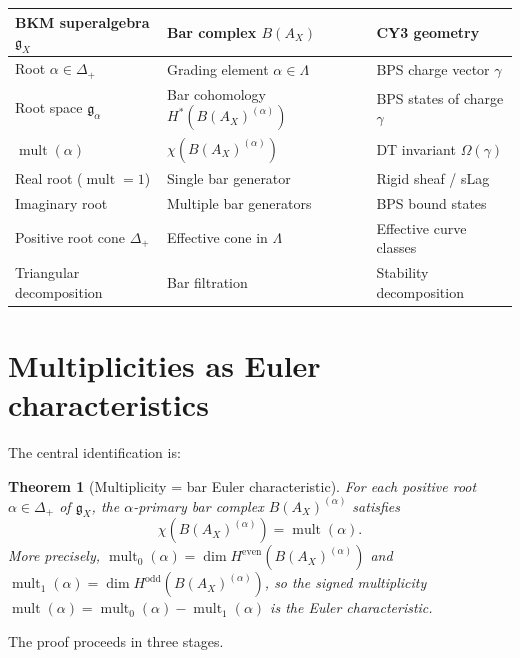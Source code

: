 \documentclass[11pt]{article}
\newtheorem{theorem}{Theorem}[section]
\theoremstyle{definition}
\theoremstyle{remark}
\DeclareMathOperator{\mult}{mult}
\newcommand{\frakg}{\mathfrak{g}}
\begin{document}
\begin{center}
\renewcommand{\arraystretch}{1.4}
\begin{tabular}{lll}
\hline
\textbf{BKM superalgebra $\frakg_X$} & \textbf{Bar complex $B(A_X)$} & \textbf{CY3 geometry} \\
\hline
Root $\alpha \in \Delta_+$ & Grading element $\alpha \in \Lambda$ & BPS charge vector $\gamma$ \\
Root space $\frakg_\alpha$ & Bar cohomology $H^*(B(A_X)^{(\alpha)})$ & BPS states of charge $\gamma$ \\
$\mult(\alpha)$ & $\chi(B(A_X)^{(\alpha)})$ & DT invariant $\Omega(\gamma)$ \\
Real root ($\mult = 1$) & Single bar generator & Rigid sheaf / sLag \\
Imaginary root & Multiple bar generators & BPS bound states \\
Positive root cone $\Delta_+$ & Effective cone in $\Lambda$ & Effective curve classes \\
Triangular decomposition & Bar filtration & Stability decomposition \\
\hline
\end{tabular}
\end{center}


\section{Multiplicities as Euler characteristics}
\label{sec:mult-euler}

The central identification is:

\begin{theorem}[Multiplicity = bar Euler characteristic]
\label{thm:mult-euler}
For each positive root $\alpha \in \Delta_+$ of $\frakg_X$, the
$\alpha$-primary bar complex $B(A_X)^{(\alpha)}$ satisfies
\begin{equation}
\label{eq:mult-euler}
 \chi(B(A_X)^{(\alpha)}) = \mult(\alpha).
\end{equation}
More precisely, $\mult_0(\alpha) = \dim H^{\mathrm{even}}(B(A_X)^{(\alpha)})$
and $\mult_1(\alpha) = \dim H^{\mathrm{odd}}(B(A_X)^{(\alpha)})$, so
the signed multiplicity $\mult(\alpha) = \mult_0(\alpha) - \mult_1(\alpha)$
is the Euler characteristic.
\end{theorem}

The proof proceeds in three stages.
\end{document}
